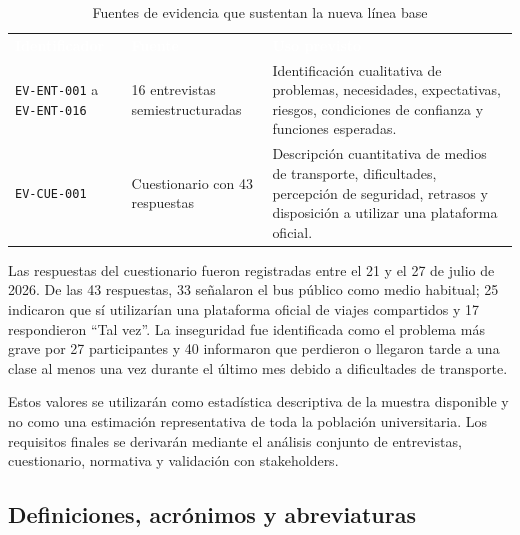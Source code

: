 \documentclass[12pt,a4paper]{article}
\begin{document}
\begin{table}[H]
\centering
\caption{Fuentes de evidencia que sustentan la nueva línea base}
\label{tab:fuentes-evidencia}
\small
{}
\begin{tabularx}{\textwidth}{L{3.0cm} L{3.4cm} Y}
\textcolor{white}{\textbf{Identificador}} &
\textcolor{white}{\textbf{Fuente}} &
\textcolor{white}{\textbf{Uso previsto}}\\
\texttt{EV-ENT-001} a \texttt{EV-ENT-016} & 16 entrevistas semiestructuradas & Identificación cualitativa de problemas, necesidades, expectativas, riesgos, condiciones de confianza y funciones esperadas.\\
\texttt{EV-CUE-001} & Cuestionario con 43 respuestas & Descripción cuantitativa de medios de transporte, dificultades, percepción de seguridad, retrasos y disposición a utilizar una plataforma oficial.\\
\end{tabularx}
\end{table}

Las respuestas del cuestionario fueron registradas entre el 21 y el 27 de julio de 2026. De las 43 respuestas, 33 señalaron el bus público como medio habitual; 25 indicaron que sí utilizarían una plataforma oficial de viajes compartidos y 17 respondieron ``Tal vez''. La inseguridad fue identificada como el problema más grave por 27 participantes y 40 informaron que perdieron o llegaron tarde a una clase al menos una vez durante el último mes debido a dificultades de transporte.

Estos valores se utilizarán como estadística descriptiva de la muestra disponible y no como una estimación representativa de toda la población universitaria. Los requisitos finales se derivarán mediante el análisis conjunto de entrevistas, cuestionario, normativa y validación con stakeholders.

\subsection{Definiciones, acrónimos y abreviaturas}
\end{document}
